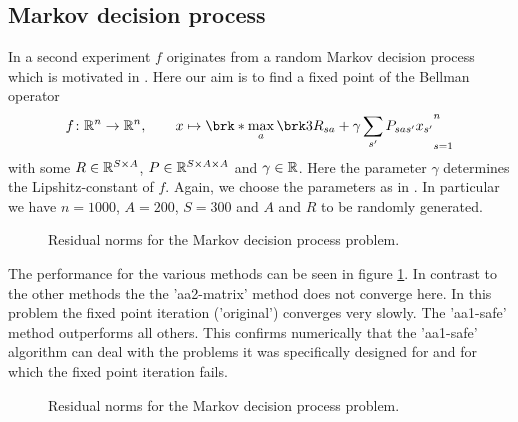 %	
%

\subsection{Markov decision process}

In a second experiment $f$ originates from a random Markov decision process which is motivated in \cite[Section 5.1f]{ZhaAA}. Here our aim is to find a fixed point of the Bellman operator
\begin{align*}
	f\colon\R^{n}\to\R^{n}, \qquad x\mapsto \brk*{\max_{a} \brk3{ R_{sa}+\gamma \sum_{s'}P_{sas'}x_{s'}}}_{s=1}^{n}
\end{align*}
with some $R\in\mathbb{R}^{S\times A}$, $P\in\mathbb{R}^{S\times A\times A}$ and $\gamma\in\mathbb{R}$. Here the parameter $\gamma$ determines the Lipshitz-constant of $f$. Again, we choose the parameters as in \cite[Section 5.2]{ZhaAA}. In particular we have $n=1000$, $A=200$, $S=300$ and $A$ and $R$ to be randomly generated.

\begin{figure}
	\centering
	{\scriptsize
	
	}
	\caption{Residual norms for the Markov decision process problem.}
	\label{pl:method_comparison_VI}
\end{figure}

The performance for the various methods can be seen in figure \ref{pl:method_comparison_VI}. In contrast to the other methods the the 'aa2-matrix' method does not converge here. In this problem the fixed point iteration ('original') converges very slowly. The 'aa1-safe' method outperforms all others. This confirms numerically that the 'aa1-safe' algorithm can deal with the problems it was specifically designed for and for which the fixed point iteration fails. 

\begin{figure}
	\centering
	{\scriptsize
	
	}
	\caption{Residual norms for the Markov decision process problem.}
	\label{pl:memory_comparison_VI}
\end{figure}


